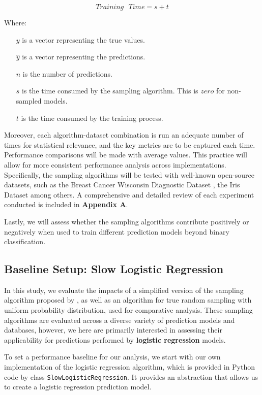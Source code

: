 \documentclass{article}
\theoremstyle{plain}
\theoremstyle{definition}
\theoremstyle{remark}
\begin{document}
$$
Training\text{ }Time = s + t
$$

Where:

\begin{itemize}
	
	\item[$y$] is a vector representing the true values.
	\item[$\hat{y}$] is a vector representing the predictions.
	\item[$n$] is the number of predictions.
	\item[$s$] is the time consumed by the sampling algorithm. This is $zero$ for non-sampled models.
	\item[$t$] is the time consumed by the training process.
	
	
\end{itemize}

Moreover, each algorithm-dataset combination is run an adequate number of times for statistical relevance, and the key metrics are to be captured each time. Performance comparisons will be made with average values. This practice will allow for more consistent performance analysis across implementations. Specifically, the sampling algorithms will be tested with well-known open-source datasets, such as the Breast Cancer Wisconsin Diagnostic Dataset \cite{breastcancer}, the Iris Dataset \cite{iris} among others. A comprehensive and detailed review of each experiment conducted is included in \textbf{Appendix A}.

Lastly, we will assess whether the sampling algorithms contribute positively or negatively when used to train different prediction models beyond binary classification.


\subsection{Baseline Setup: Slow Logistic Regression}

In this study, we evaluate the impacts of a simplified version of the sampling algorithm proposed by \citet{chow24}, as well as an algorithm for true random sampling with uniform probability distribution, used for comparative analysis. These sampling algorithms are evaluated across a diverse variety of prediction models and databases, however, we here are primarily interested in assessing their applicability for predictions performed by \textbf{logistic regression} models. 

To set a performance baseline for our analysis, we start with our own implementation of the logistic regression algorithm, which is provided in Python code by class \texttt{SlowLogisticRegression}. It provides an abstraction that allows us to create a logistic regression prediction model.
\end{document}
